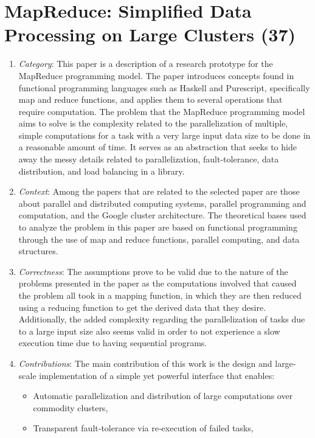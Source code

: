 \newpage
\section[MapReduce: Simplified Data Processing on Large Clusters (37)]{MapReduce: Simplified Data Processing on Large Clusters (37) \cite{Dean2004MapReduce}}

\begin{enumerate}
    \item \textit{Category}: This paper is a description of a research prototype for the MapReduce programming model. The paper introduces concepts found in functional programming languages such as Haskell and Purescript, specifically map and reduce functions, and applies them to several operations that require computation. The problem that the MapReduce programming model aims to solve is the complexity related to the parallelization of multiple, simple computations for a task with a very large input data size to be done in a reasonable amount of time. It serves as an abstraction that seeks to hide away the messy details related to parallelization, fault-tolerance, data distribution, and load balancing in a library.
    \item \textit{Context}: Among the papers that are related to the selected paper are those about parallel and distributed computing systems, parallel programming and computation, and the Google cluster architecture. The theoretical bases used to analyze the problem in this paper are based on functional programming through the use of map and reduce functions, parallel computing, and data structures.
    \item \textit{Correctness}: The assumptions prove to be valid due to the nature of the problems presented in the paper as the computations involved that caused the problem all took in a mapping function, in which they are then reduced using a reducing function to get the derived data that they desire. Additionally, the added complexity regarding the parallelization of tasks due to a large input size also seems valid in order to not experience a slow execution time due to having sequential programs.
    \item \textit{Contributions}:
    The main contribution of this work is the design and large‐scale implementation of a simple yet powerful interface that enables:
    \begin{itemize}
        \item Automatic parallelization and distribution of large computations over commodity clusters,
        \item Transparent fault‐tolerance via re‐execution of failed tasks,

\end{itemize}
\end{enumerate}
